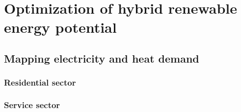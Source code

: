 \chapter{Optimization of hybrid renewable energy potential}
\label{hybrid_chapter}

\section{Mapping electricity and heat demand}
\label{demand_chapter}

\subsection{Residential sector}

\subsection{Service sector}
